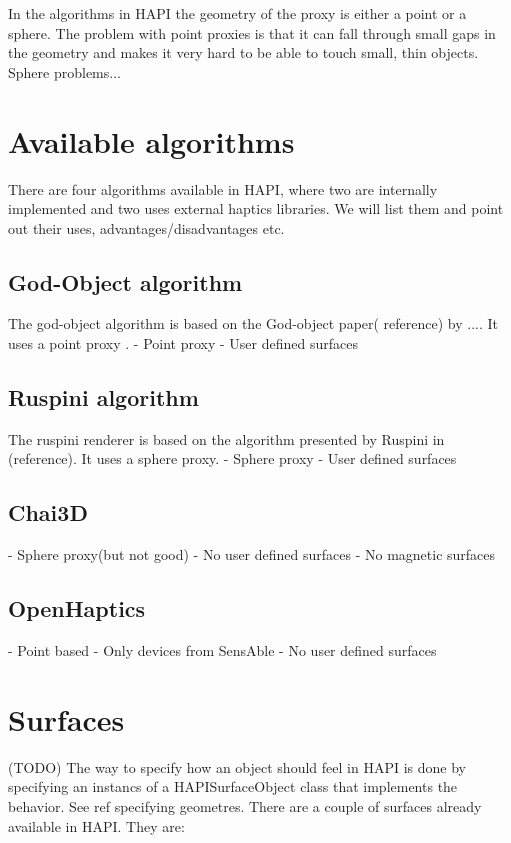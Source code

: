 In the algorithms in HAPI the geometry of the proxy is either a point
or a sphere. The problem with point proxies is that it can fall
through small gaps in the geometry and makes it very hard to be able
to touch small, thin objects. Sphere problems... 

\section{Available algorithms}
There are four algorithms available in HAPI, where two are internally
implemented and two uses external haptics libraries. We will list them
and point out their uses, advantages/disadvantages etc.

\subsection{God-Object algorithm}
The god-object algorithm is based on the God-object paper( reference)
by .... It uses a point proxy .
- Point proxy
- User defined surfaces

\subsection{Ruspini algorithm}
The ruspini renderer is based on the algorithm presented by Ruspini in
(reference). It uses a sphere proxy.
- Sphere proxy
- User defined surfaces


\subsection{Chai3D}
- Sphere proxy(but not good)
- No user defined surfaces
- No magnetic surfaces

\subsection{OpenHaptics}
- Point based
- Only devices from SensAble
- No user defined surfaces

\section{Surfaces}
(TODO)
The way to specify how an object should feel in HAPI is done by
specifying an instancs of a HAPISurfaceObject class that implements
the behavior. See ref specifying geometres. There are a couple of
surfaces already available in HAPI. They are:

